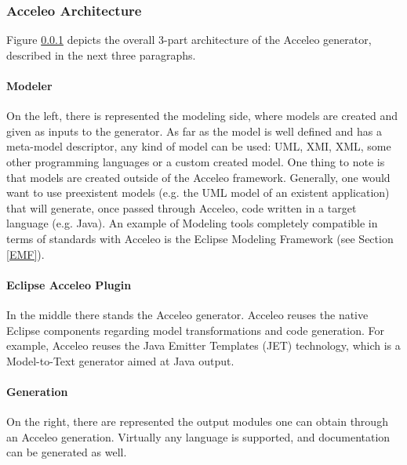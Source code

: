 \subsubsection{Acceleo Architecture}
\label{AcceleoArchitecture}
Figure \ref{AcceleoArchitecture} depicts the overall 3-part architecture of the Acceleo generator, described in the next three paragraphs.
\paragraph{Modeler}
On the left, there is represented the modeling side, where models are created and given as inputs to the generator. As far as the model is well defined and has a meta-model descriptor, any kind of model can be used: UML, XMI, XML, some other programming languages or a custom created model. One thing to note is that models are created outside of the Acceleo framework. Generally, one would want to use preexistent models (e.g. the UML model of an existent application) that will generate, once passed through Acceleo, code written in a target language (e.g. Java). 
An example of Modeling tools completely compatible in terms of standards with Acceleo is the Eclipse Modeling Framework (see Section \ref{EMF}).   
\paragraph{Eclipse Acceleo Plugin}
In the middle there stands the Acceleo generator. Acceleo reuses the native Eclipse components regarding model transformations and code generation. For example, Acceleo reuses the Java Emitter Templates (JET) technology, which is a Model-to-Text generator aimed at Java output.
\paragraph{Generation}
On the right, there are represented the output modules one can obtain through an Acceleo generation. Virtually any language is supported, and documentation can be generated as well.

